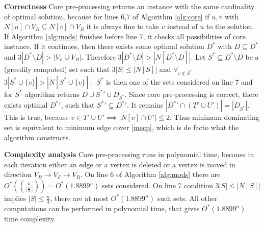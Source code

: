 \textbf{Correctness} Core pre-processing returns an instance with the same cardinality of optimal solution, because for lines 6,7 of Algorithm \ref{alg:core} if $u, v$ with $N[u] \cap V_B \subseteq N[v] \cap V_B$ it is always fine to take $v$ instead of $u$ to the solution. If Algorithm \ref{alg:mods} finishes before line 7, it checks all possibilities of core instance. If it continues, then there exists some optimal solution $D^*$ with $D \subseteq D^*$ and $3|D^* \setminus D| > |V_F \cup V_B|$. Therefore $3|D^* \setminus D| > |N[D^* \setminus D]|$. Let $S^* \subseteq D^* \setminus D$ be a (greedily computed) set such that $3|S| \leq |N[S]|$ and $\forall_{v\notin S^*}$ $3|S^* \cup \{v\}| > |N[S^* \cup \{v\}]|$. $S^*$ is then one of the sets considered on line 7 and for $S^*$ algorithm returns $D\cup {S^*}' \cup D_{S^*}$. Since core pre-processing is correct, there exists optimal ${D^*}'$, such that ${S^*}' \subseteq {D^*}'$. It remains $|{D^*}' \cap (T' \cup U')| = |D_{S^*}|$. This is true, because $v\in T' \cup U' \implies |N[v] \cap U'| \leq 2$. Thus minimum dominating set is equivalent to minimum edge cover \ref{mecp}, which is de facto what the algorithm constructs.
\par\textbf{Complexity analysis} Core pre-processing runs in polynomial time, because in each iteration either an edge or a vertex is deleted or a vertex is moved in direction $V_B \to V_F \to V_R$. On line 6 of Algorithm \ref{alg:mods} there are $O^*(\binom{n}{\lfloor\frac{n}{3}\rfloor}) = O^*(1.8899^n)$ sets considered. On line 7 condition $3|S| \leq |N[S]|$ implies $|S| \leq \frac{n}{3}$, there are at most $O^*(1.8899^n)$ such sets. All other computations can be performed in polynomial time, that gives $O^*(1.8899^n)$ time complexity.
